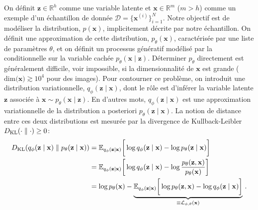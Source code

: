 On définit $\mathbf{z}\in \mathbb{R}^{h}$ comme une variable latente et $\mathbf{x}\in \mathbb{R}^{m}$ ($m > h$) 
comme un exemple d'un échantillon de donnée $\mathcal{D} = \{\mathbf{x}^{(i)}\}_{i=1}^{N}$. 
Notre objectif est de modéliser la distribution, $p(\mathbf{x})$, implicitement décrite par notre échantillon. 
On définit une approximation de cette distribution, $p_\theta(\mathbf{x})$, caractérisée par une liste de paramètres $\theta$,
et on définit un processus génératif modélisé par la conditionnelle sur la variable cachée $p_\theta(\mathbf{x \mid \mathbf{z}})$. 
Déterminer $p_\theta$ directement est généralement difficile, voir impossible, si la dimensionnalité de $\mathbf{x}$ est grande 
($\mathrm{dim(\mathbf{x}}) \gtrsim 10^{4}$ pour des images). 
Pour contourner ce problème, on introduit une distribution variationnelle, $q_\phi(\mathbf{z} \mid \mathbf{x})$, dont le rôle est 
d'inférer la variable latente $\mathbf{z}$ associée à $\mathbf{x} \sim p_\theta(\mathbf{x} \mid \mathbf{z})$. 
En d'autres mots, $q_\phi(\mathbf{z} \mid \mathbf{x})$ est une approximation variationnelle de la distribution a posteriori $p_\theta(\mathbf{z} \mid \mathbf{x})$.
La notion de distance entre ces deux distributions est mesurée par la divergence de Kullback-Leibler $D_{\mathrm{KL}}(\cdot \mathrel{\Vert} \cdot) \geq 0$: 
\begin{align}
        \nonumber
       D_{\mathrm{KL}}(q_\phi(\mathbf{z} \mid \mathbf{x}) \mathrel{\Vert}  p_\theta (\mathbf{z} \mid \mathbf{x})) 
       &= \mathbb{E}_{q_\phi(\mathbf{z} \mid \mathbf{x})} \bigg[\log q_\phi(\mathbf{z} \mid \mathbf{x}) - \log p_\theta (\mathbf{z} \mid \mathbf{x}) \bigg]  \\
       \nonumber
       &= \mathbb{E}_{q_\phi(\mathbf{z} \mid \mathbf{x})} \bigg[\log q_\phi (\mathbf{z} \mid \mathbf{x}) -\log \frac{p_\theta(\mathbf{z}, \mathbf{x})}{p_\theta(\mathbf{x})} \bigg]  \\
       \label{eq:KL}
       &= \log p_\theta (\mathbf{x}) - \underbrace{\mathbb{E}_{q_\phi(\mathbf{z} \mid \mathbf{x})} \bigg[\log p_\theta(\mathbf{z}, \mathbf{x}) - \log q_\phi (\mathbf{z} \mid \mathbf{x}) \bigg]}_{\equiv \mathcal{L}_{\phi,\theta}(\mathbf{x})} \, .
\end{align} 


